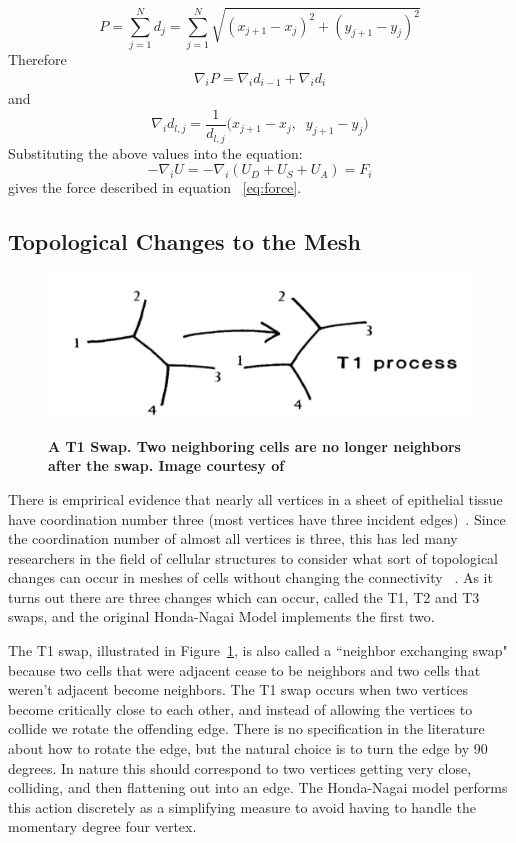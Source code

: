 \begin{equation}
P = \sum\limits_{j=1}^Nd_j = \sum\limits_{j=1}^N\sqrt{(x_{j+1} - x_j)^2 + (y_{j+1} - y_j)^2}
\end{equation}
Therefore
\begin{gather}
\nabla_iP = \nabla_id_{i-1} + \nabla_id_i
\end{gather}
and
\begin{equation}
\nabla_id_{l, j} = \frac1{d_{l, j}}
\Big(
x_{j+1}- x_j,\;\; y_{j+1} - y_j
\Big)
\end{equation}
Substituting the above values into the equation:
\begin{equation}
-\nabla_iU = -\nabla_i(U_D + U_S + U_A) = F_i
\end{equation}
gives the force described in equation ~\ref{eq:force}.

\subsection{Topological Changes to the Mesh}
\begin{figure}
    \centering
    \includegraphics[width=\textwidth, keepaspectratio]{../diagrams/t1.png}
    \label{fig:t1}
    \caption[A T1 Swap]{\textbf{A T1 Swap. Two neighboring cells are no longer neighbors after the swap. Image courtesy of}~\cite{Soap}}
\end{figure}
There is emprirical evidence that nearly all vertices in a sheet of epithelial tissue have coordination number three (most vertices have three incident edges)~\cite{EpithelialTopology}. Since the coordination number of almost all vertices is three, this has led many researchers in the field of cellular structures to consider what sort of topological changes can occur in meshes of cells without changing the connectivity ~\cite{Soap}.  As it turns out there are three changes which can occur, called the T1, T2 and T3 swaps, and the original Honda-Nagai Model implements the first two.

 The T1 swap, illustrated in Figure~\ref{fig:t1}, is also called a ``neighbor exchanging swap" because two cells that were adjacent cease to be neighbors and two cells that weren't adjacent become neighbors. The T1 swap occurs when two vertices become critically close to each other, and instead of allowing the vertices to collide we rotate the offending edge. There is no specification in the literature about how to rotate the edge, but the natural choice is to turn the edge by 90 degrees. In nature this should correspond to two vertices getting very close, colliding, and then flattening out into an edge. The Honda-Nagai model performs this action discretely as a simplifying measure to avoid having to handle the momentary degree four vertex.

